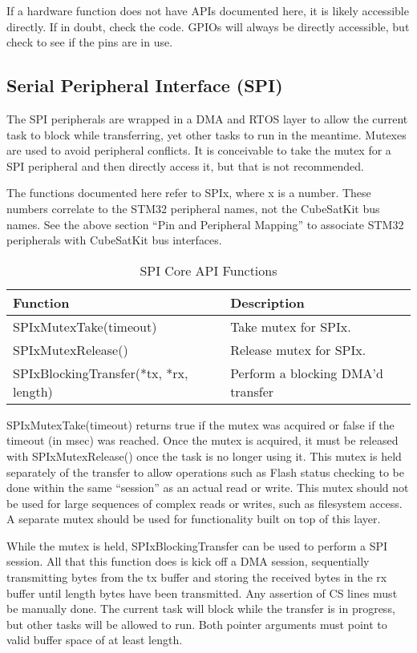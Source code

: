 \documentclass{article}
\begin{document}
If a hardware function does not have APIs documented here, it is likely
accessible directly. If in doubt, check the code. GPIOs will always be directly 
accessible, but check
to see if the pins are in use.

\subsection{Serial Peripheral Interface (SPI)}
The SPI peripherals are wrapped in a DMA and RTOS layer to allow the current
task to block while transferring, yet other tasks to run in the meantime.
Mutexes are used to avoid peripheral conflicts. It is conceivable to take the
mutex for a SPI peripheral and then directly access it, but that is not
recommended.

The functions documented here refer to SPIx, where x is a number. These numbers
correlate to the STM32 peripheral names, not the CubeSatKit bus names. See
the above section ``Pin and Peripheral Mapping'' to associate STM32 peripherals
with CubeSatKit bus interfaces.

\begin{table}
\begin{center}
\caption{SPI Core API Functions}
\begin{tabular}{| l | l |}
    \hline 
    Function & Description \\ \hline
    SPIxMutexTake(timeout) & Take mutex for SPIx.  \\ \hline
    SPIxMutexRelease() & Release mutex for SPIx. \\ \hline
    SPIxBlockingTransfer(*tx, *rx, length) & Perform a blocking DMA'd transfer \\ \hline
\end{tabular}
\end{center}
\end{table}

SPIxMutexTake(timeout) returns true if the mutex was acquired or false if the
timeout (in msec) was reached. Once the mutex is acquired, it must be released
with SPIxMutexRelease()
once the task is no longer using it. This mutex is held separately of the
transfer to allow operations such as Flash status checking to be done within the
same ``session'' as an actual read or write. This mutex should not be used for
large sequences of complex reads or writes, such as filesystem access. A separate
mutex should be used for functionality built on top of this layer.
    
While the mutex is held, SPIxBlockingTransfer can be used to perform a SPI session.
All that this function does is kick off a DMA session, sequentially transmitting
bytes from the tx buffer and storing the received bytes in the rx buffer until
length bytes have been transmitted. Any assertion of CS lines must be manually
done. The current task will block while the transfer is in progress, but other
tasks will be allowed to run. Both pointer arguments must point to valid buffer
space of at least length.
\end{document}
